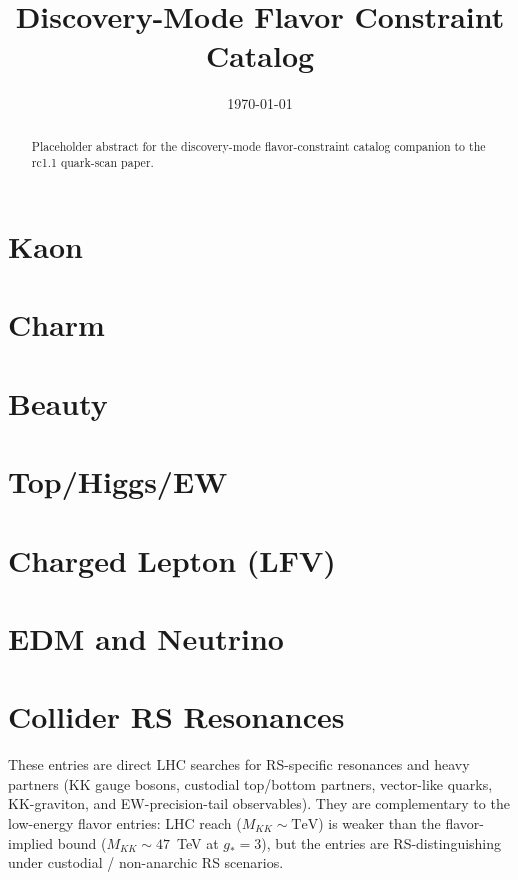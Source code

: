 \documentclass[11pt]{article}
\title{Discovery-Mode Flavor Constraint Catalog}
\author{}
\date{\today}
\begin{document}
\maketitle

\begin{abstract}
Placeholder abstract for the discovery-mode flavor-constraint catalog companion to the rc1.1 quark-scan paper.
\end{abstract}

\section{Kaon}


\section{Charm}


\section{Beauty}


\section{Top/Higgs/EW}


\section{Charged Lepton (LFV)}


\section{EDM and Neutrino}


\section{Collider RS Resonances}

These entries are direct LHC searches for RS-specific resonances and
heavy partners (KK gauge bosons, custodial top/bottom partners,
vector-like quarks, KK-graviton, and EW-precision-tail observables).
They are complementary to the low-energy flavor entries: LHC reach
($M_{KK}\sim\text{TeV}$) is weaker than the flavor-implied bound
($M_{KK}\sim 47$~TeV at $g_*=3$), but the entries are
RS-distinguishing under custodial / non-anarchic RS scenarios.
\end{document}
